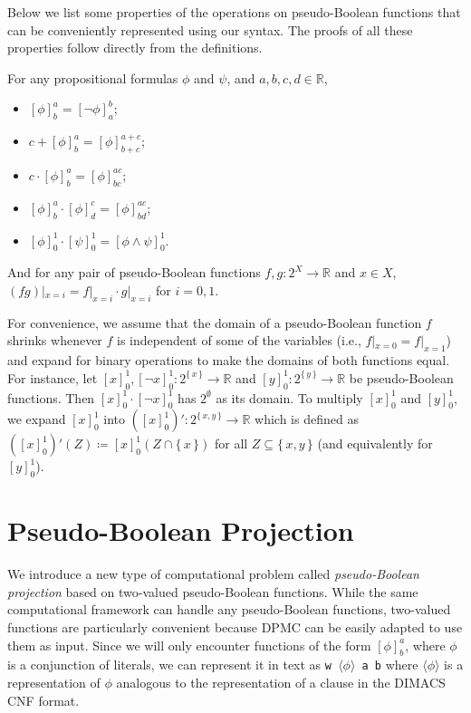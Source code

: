 Below we list some properties of the operations on pseudo-Boolean functions that
can be conveniently represented using our syntax. The proofs of all these
properties follow directly from the definitions.

\begin{proposition}\label{prop:basic}
  For any propositional formulas $\phi$ and $\psi$, and
  $a, b, c, d \in \mathbb{R}$,
  \begin{itemize}
    \item ${[\phi]}^a_b = {[\neg \phi]}^b_a$;
    \item $c + {[\phi]}^a_b = {[\phi]}^{a+c}_{b+c}$;
    \item $c \cdot {[\phi]}^a_b = {[\phi]}^{ac}_{bc}$;
    \item ${[\phi]}^a_b \cdot {[\phi]}^c_d = {[\phi]}^{ac}_{bd}$;
    \item ${[\phi]}^1_0 \cdot {[\psi]}_0^1 = {[\phi \land \psi]}_0^1$.
  \end{itemize}
  And for any pair of pseudo-Boolean functions $f, g \colon 2^X \to \mathbb{R}$
  and $x \in X$, $(fg)|_{x=i} = f|_{x=i} \cdot g|_{x=i}$ for $i = 0, 1$.
\end{proposition}

\begin{remark}
  For convenience, we assume that the domain of a pseudo-Boolean function $f$
  shrinks whenever $f$ is independent of some of the variables (i.e.,
  $f|_{x=0} = f|_{x=1}$) and expand for binary operations to make the domains of
  both functions equal. For instance, let
  ${[x]}_0^1,{[\neg x]}_0^1\colon 2^{\{\, x \,\}} \to \mathbb{R}$ and
  ${[y]}_0^1\colon 2^{\{\, y \,\}} \to \mathbb{R}$ be pseudo-Boolean functions.
  Then ${[x]}_0^1 \cdot {[\neg x]}_0^1$ has $2^\emptyset$ as its domain. To
  multiply ${[x]}_0^1$ and ${[y]}_0^1$, we expand ${[x]}_0^1$ into
  $\left({[x]}_0^1\right)'\colon 2^{\{\, x, y \,\}} \to \mathbb{R}$ which is
  defined as
  $\left({[x]}_0^1\right)'(Z) \coloneqq {[x]}_0^1(Z \cap \{\, x \,\})$ for all
  $Z \subseteq \{\, x, y \,\}$ (and equivalently for ${[y]}_0^1$).
\end{remark}

\section{Pseudo-Boolean Projection}

We introduce a new type of computational problem called \emph{pseudo-Boolean
  projection} based on two-valued pseudo-Boolean functions. While the same
computational framework can handle any pseudo-Boolean functions, two-valued
functions are particularly convenient because \textsc{DPMC}
\citep{DBLP:conf/cp/DudekPV20} can be easily adapted to use them as input. Since
we will only encounter functions of the form ${[\phi]}^a_b$, where $\phi$ is a
conjunction of literals, we can represent it in text as \texttt{w
  $\langle\phi\rangle$ a b} where $\langle\phi\rangle$ is a representation of
$\phi$ analogous to the representation of a clause in the DIMACS CNF format.

